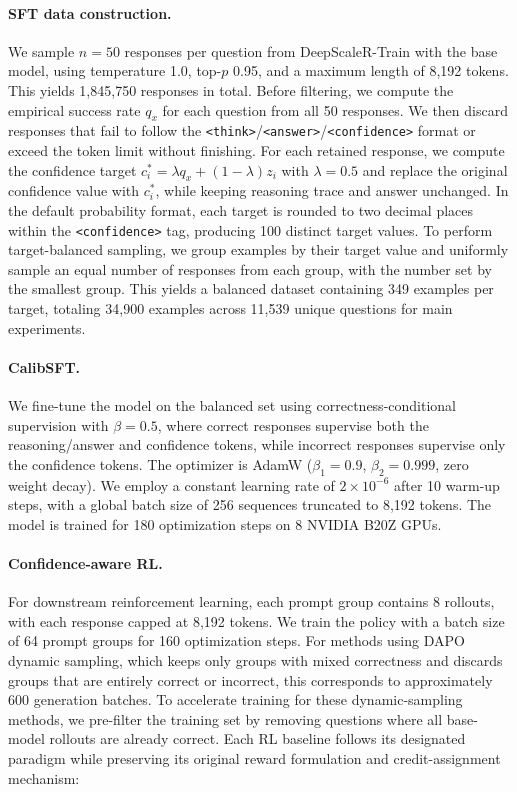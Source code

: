 \documentclass{article} %
\begin{document}
\paragraph{SFT data construction.}
\label{sec:calibsft_data_details}
We sample $n=50$ responses per question from DeepScaleR-Train with the base model, using temperature 1.0, top-$p$ 0.95, and a maximum length of 8{,}192 tokens. This yields 1{,}845{,}750 responses in total.
Before filtering, we compute the empirical success rate $q_x$ for each question from all 50 responses.
We then discard responses that fail to follow the \texttt{<think>}/\texttt{<answer>}/\texttt{<confidence>} format or exceed the token limit without finishing.
For each retained response, we compute the confidence target $c_i^*=\lambda q_x+(1-\lambda)z_i$ with $\lambda=0.5$ and replace the original confidence value with $c_i^*$, while keeping reasoning trace and answer unchanged.
In the default probability format, each target is rounded to two decimal places within the \texttt{<confidence>} tag, producing 100 distinct target values.
To perform target-balanced sampling, we group examples by their target value and uniformly sample an equal number of responses from each group, with the number set by the smallest group.
This yields a balanced dataset containing 349 examples per target, totaling 34{,}900 examples across 11{,}539 unique questions for main experiments.


\paragraph{CalibSFT.}
We fine-tune the model on the balanced set using correctness-conditional supervision with $\beta=0.5$, 
where correct responses supervise both the reasoning/answer and confidence tokens, 
while incorrect responses supervise only the confidence tokens.
The optimizer is AdamW ($\beta_1=0.9$, $\beta_2=0.999$, zero weight decay).
We employ a constant learning rate of $2\times10^{-6}$ after 10 warm-up steps, with a global batch size of 256 sequences truncated to 8{,}192 tokens.
The model is trained for 180 optimization steps on 8 NVIDIA B20Z GPUs.

\paragraph{Confidence-aware RL.}
For downstream reinforcement learning, each prompt group contains 8 rollouts, with each response capped at 8{,}192 tokens.
We train the policy with a batch size of 64 prompt groups for 160 optimization steps.
For methods using DAPO dynamic sampling, which keeps only groups with mixed correctness and discards groups that are entirely correct or incorrect, this corresponds to approximately 600 generation batches.
To accelerate training for these dynamic-sampling methods, we pre-filter the training set by removing questions where all base-model rollouts are already correct.
Each RL baseline follows its designated paradigm while preserving its original reward formulation and credit-assignment mechanism:
\end{document}
